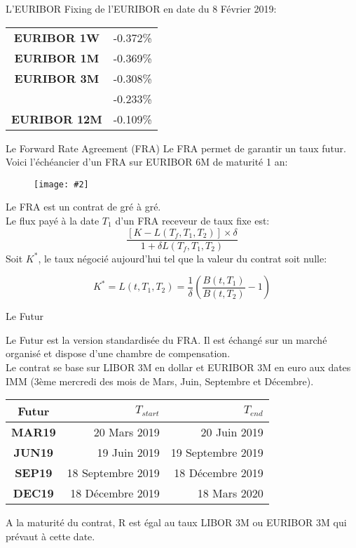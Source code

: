 \documentclass{beamer}
\newcommand{\FIG}[2]{\texttt{[image: \#2]}}
\begin{document}
\begin{frame}{L'EURIBOR}
Fixing de l'EURIBOR en date du 8 Février 2019:
\Large
\begin{center}
\begin{tabular}{|c|r|}
  \hline
  \textbf{EURIBOR 1W} & -0.372\% \\
  \textbf{EURIBOR 1M} & -0.369\% \\
  \textbf{EURIBOR 3M} & -0.308\% \\
  \textbf{\color{red}{EURIBOR 6M}} & -0.233\% \\
  \textbf{EURIBOR 12M} & -0.109\%  \\
  \hline
\end{tabular}
\end{center}
\end{frame}


\begin{frame}{Le Forward Rate Agreement (FRA)}
Le FRA permet de garantir un taux futur.\\
Voici l'échéancier d'un FRA sur EURIBOR 6M de maturité 1 an:
\begin{figure}[h]
\FIG{7cm}{figures/schema_fra.jpg} 
\end{figure}
Le FRA est un contrat de gré à gré.\\
Le flux payé à la date $T_1$ d'un FRA receveur de taux fixe est:
\[
\frac{[K-L(T_f,T_1,T_2)]\times\delta}{1+\delta L(T_f,T_1,T_2)}
\]
Soit $K^*$, le taux négocié aujourd'hui tel que la valeur du contrat soit nulle:

\[
K^*=L(t,T_1, T_2)=\frac{1}{\delta}\left(\frac{B(t,T_1)}{B(t,T_2)}-1\right)
\]
\end{frame}

\begin{frame}{Le Futur}

Le Futur est la version standardisée du FRA. Il est échangé sur un marché organisé et dispose d'une chambre de compensation.\\
Le contrat se base sur LIBOR 3M en dollar et EURIBOR 3M en euro aux dates IMM (3ème mercredi des mois de Mars, Juin, Septembre et Décembre).\\
\begin{center}
\begin{tabular}{|c|r|r|}
  \hline
  \textbf{Futur} & \textbf{$T_{start}$} & \textbf{$T_{end}$} \\
  \hline
  \textbf{MAR19} & 20 Mars 2019 & 20 Juin 2019 \\
  \textbf{JUN19} & 19 Juin 2019 & 19 Septembre 2019 \\
  \textbf{SEP19} & 18 Septembre 2019 & 18 Décembre 2019 \\
  \textbf{DEC19} & 18 Décembre 2019 &  18 Mars 2020 \\
  \hline
\end{tabular}
\end{center}
A la maturité du contrat, R est égal au taux LIBOR 3M ou EURIBOR 3M qui prévaut à cette date.
\end{frame}
\end{document}
